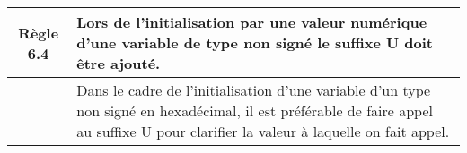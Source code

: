 \medskip

\begin{center}
\begin{tabular}{|c p{12.3cm}|}
\hline
\rowcolor{red!10}\textbf{Règle 6.4} & Lors de l'initialisation par une valeur numérique d'une variable de type non signé le suffixe U doit être ajouté.\\ \hline
 & Dans le cadre de l’initialisation d’une variable d’un type non signé en hexadécimal, il est préférable de faire appel au suffixe U pour clarifier la valeur à laquelle on fait appel.\\ \hline
\hline
\end{tabular}
\end{center}

\medskip

\pagebreak